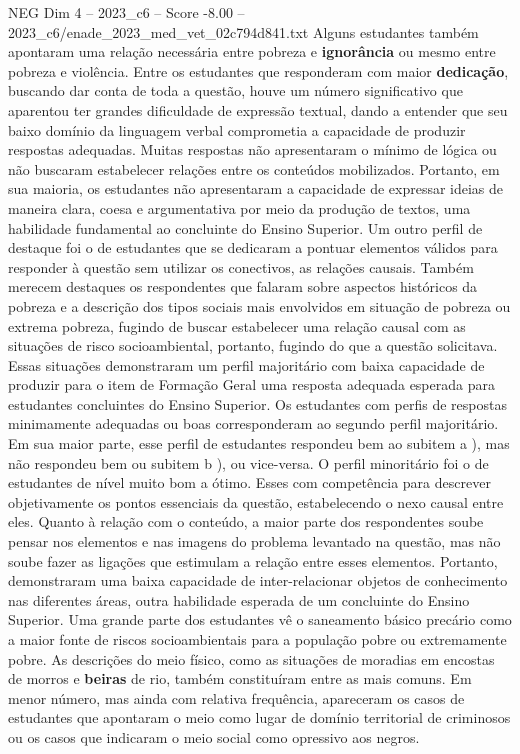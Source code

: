 \begin{textsample}{NEG Dim 4 – 2023\_c6 – Score -8.00 – 2023\_c6/enade\_2023\_med\_vet\_02c794d841.txt}
Alguns estudantes também apontaram uma relação necessária entre pobreza e \textbf{ignorância} ou mesmo entre pobreza e violência.
Entre os estudantes que responderam com maior \textbf{dedicação}, buscando dar conta de toda a questão, houve um número significativo que aparentou ter grandes dificuldade de expressão textual, dando a entender que seu baixo domínio da linguagem verbal comprometia a capacidade de produzir respostas adequadas.
Muitas respostas não apresentaram o mínimo de lógica ou não buscaram estabelecer relações entre os conteúdos mobilizados.
Portanto, em sua maioria, os estudantes não apresentaram a capacidade de expressar ideias de maneira clara, coesa e argumentativa por meio da produção de textos, uma habilidade fundamental ao concluinte do Ensino Superior.
Um outro perfil de destaque foi o de estudantes que se dedicaram a pontuar elementos válidos para responder à questão sem utilizar os conectivos, as relações causais.
Também merecem destaques os respondentes que falaram sobre aspectos históricos da pobreza e a descrição dos tipos sociais mais envolvidos em situação de pobreza ou extrema pobreza, fugindo de buscar estabelecer uma relação causal com as situações de risco socioambiental, portanto, fugindo do que a questão solicitava.
Essas situações demonstraram um perfil majoritário com baixa capacidade de produzir para o item de Formação Geral uma resposta adequada esperada para estudantes concluintes do Ensino Superior.
Os estudantes com perfis de respostas minimamente adequadas ou boas corresponderam ao segundo perfil majoritário.
Em sua maior parte, esse perfil de estudantes respondeu bem ao subitem a ), mas não respondeu bem ou subitem b ), ou vice-versa.
O perfil minoritário foi o de estudantes de nível muito bom a ótimo.
Esses com competência para descrever objetivamente os pontos essenciais da questão, estabelecendo o nexo causal entre eles.
Quanto à relação com o conteúdo, a maior parte dos respondentes soube pensar nos elementos e nas imagens do problema levantado na questão, mas não soube fazer as ligações que estimulam a relação entre esses elementos.
Portanto, demonstraram uma baixa capacidade de inter-relacionar objetos de conhecimento nas diferentes áreas, outra habilidade esperada de um concluinte do Ensino Superior.
Uma grande parte dos estudantes vê o saneamento básico precário como a maior fonte de riscos socioambientais para a população pobre ou extremamente pobre.
As descrições do meio físico, como as situações de moradias em encostas de morros e \textbf{beiras} de rio, também constituíram entre as mais comuns.
Em menor número, mas ainda com relativa frequência, apareceram os casos de estudantes que apontaram o meio como lugar de domínio territorial de criminosos ou os casos que indicaram o meio social como opressivo aos negros.

\end{textsample}
